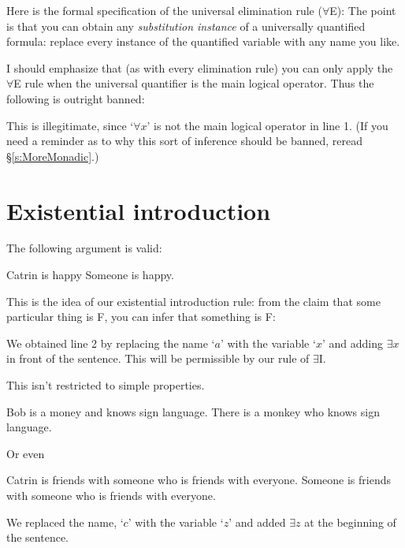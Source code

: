 Here is the formal specification of the universal elimination rule ($\forall$E):
The point is that you can obtain any \emph{substitution instance} of a universally quantified formula: replace every instance of the quantified variable with any name you like.

I should emphasize that (as with every elimination rule) you can only apply the $\forall$E rule when the universal quantifier is the main logical operator. Thus the following is outright banned:
\begin{pf}
\end{pf}
This is illegitimate, since `$\forall x$' is not the main logical operator in line 1. (If you need a reminder as to why this sort of inference should be banned, reread \S\ref{s:MoreMonadic}.)

\section{Existential introduction}
The following argument is valid:
\begin{earg}
\prem Catrin is happy
\conc Someone is happy.
\end{earg}

This is the idea of our existential introduction rule: from the claim that some particular thing is F, you can infer that something is F:
\begin{pf}
	 
\end{pf}
We obtained line 2 by replacing the name `$a$' with the variable `$x$' and adding $\exists x$ in front of the sentence. This will be permissible by our rule of $\exists$I.

This isn't restricted to simple properties.
\begin{earg}
\prem Bob is a money and knows sign language.
\conc There is a monkey who knows sign language.
\end{earg}
\begin{pf}
	 
\end{pf}

Or even
\begin{earg}
\prem Catrin is friends with someone who is friends with everyone.
\conc Someone is friends with someone who is friends with everyone.
\end{earg}
\begin{pf}
	 
\end{pf}We replaced the name, `$c$' with the variable `$z$' and added $\exists z$ at the beginning of the sentence.


